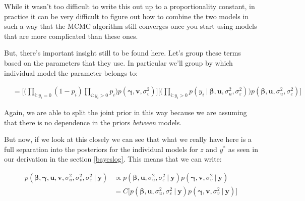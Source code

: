 \documentclass[12pt,twoside]{reedthesis}
\begin{document}
While it wasn't too difficult to write this out up to a proportionality constant, in practice it can be very difficult to figure out how to combine the two models in such a way that the MCMC algorithm still converges once you start using models that are more complicated than these ones.

But, there's important insight still to be found here. Let's group these terms based on the parameters that they use. In particular we'll group by which individual model the parameter belongs to:

\[
\begin{aligned}
&= \Bigg[\Big(\prod_{i:y_i = 0}(1- p_i)\prod_{i: y_i > 0}p_i\Big)p(\boldsymbol{\gamma}, \mathbf{v}, \sigma_v^2)\Bigg]\Bigg[\Big(\prod_{i:y_i > 0}p(y_i \ | \ \boldsymbol{\beta}, \mathbf{u}, \sigma_u^2, \sigma_{\varepsilon}^2)\Big)p(\boldsymbol{\beta},\mathbf{u}, \sigma_u^2, \sigma_{\varepsilon}^2)\Bigg]
\end{aligned}
\]

Again, we are able to split the joint prior in this way because we are assuming that there is no dependence in the priors \emph{between} models.

But now, if we look at this closely we can see that what we really have here is a full separation into the posteriors for the individual models for \(z\) and \(y^*\) as seen in our derivation in the section \ref{bayeslog}. This means that we can write:

\[
\begin{aligned}
p(\boldsymbol{\beta}, \boldsymbol{\gamma}, \mathbf{u}, \mathbf{v}, \sigma_u^2, \sigma_v^2, \sigma_{\varepsilon}^2\ | \ \mathbf{y})  &\propto p(\boldsymbol{\beta}, \mathbf{u}, \sigma_u^2, \sigma_{\varepsilon}^2 \ | \ \mathbf{y})p(\boldsymbol{\gamma}, \mathbf{v}, \sigma_v^2 \ | \ \mathbf{y}) \\
  &= C\bigg[p(\boldsymbol{\beta}, \mathbf{u}, \sigma_u^2, \sigma_{\varepsilon}^2 \ | \ \mathbf{y})p(\boldsymbol{\gamma}, \mathbf{v}, \sigma_v^2 \ | \ \mathbf{y})\bigg]
\end{aligned}
\]
\end{document}
